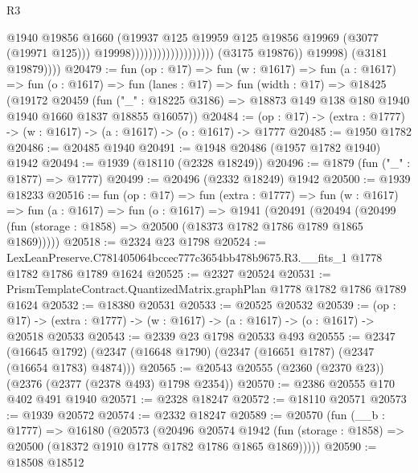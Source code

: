 \begin{lexlean}{R3}
\begin{coremodule}
                                                    @1940
                                                    @19856
                                                    @1660
                                                    (@19937
                                                      @125
                                                      @19959
                                                      @125
                                                      @19856
                                                      @19969
                                                      (@3077 (@19971 @125)))
                                                    @19998)))))))))))))))))))
              (@3175 @19876))
            @19998)
          (@3181 @19879))))
@20479 := fun (op : @17) =>
  fun (w : @1617) =>
  fun (a : @1617) =>
  fun (o : @1617) =>
  fun (lanes : @17) =>
  fun (width : @17) =>
  @18425
    (@19172
      @20459
      (fun ("_" : @18225 @3186) => @18873 @149 @138 @180 @1940 @1940 @1660 @1837 @18855 @16057))
@20484 := (op : @17) -> (extra : @1777) -> (w : @1617) -> (a : @1617) -> (o : @1617) -> @1777
@20485 := @1950 @1782
@20486 := @20485 @1940
@20491 := @1948 @20486 (@1957 @1782 @1940) @1942
@20494 := @1939 (@18110 (@2328 @18249))
@20496 := @1879 (fun ("_" : @1877) => @1777)
@20499 := @20496 (@2332 @18249) @1942
@20500 := @1939 @18233
@20516 := fun (op : @17) =>
  fun (extra : @1777) =>
  fun (w : @1617) =>
  fun (a : @1617) =>
  fun (o : @1617) =>
  @1941
    (@20491
      (@20494 (@20499 (fun (storage : @1858) => @20500 (@18373 @1782 @1786 @1789 @1865 @1869)))))
@20518 := @2324 @23 @1798
@20524 := LexLeanPreserve.C781405064bccec777c3654bb478b9675.R3.__fits_1
    @1778
    @1782
    @1786
    @1789
    @1624
@20525 := @2327 @20524
@20531 := PrismTemplateContract.QuantizedMatrix.graphPlan @1778 @1782 @1786 @1789 @1624
@20532 := @18380 @20531
@20533 := @20525 @20532
@20539 := (op : @17) ->
  (extra : @1777) -> (w : @1617) -> (a : @1617) -> (o : @1617) -> @20518 @20533
@20543 := @2339 @23 @1798 @20533 @493
@20555 := @2347
    (@16645 @1792)
    (@2347 (@16648 @1790) (@2347 (@16651 @1787) (@2347 (@16654 @1783) @4874)))
@20565 := @20543 @20555 (@2360 (@2370 @23)) (@2376 (@2377 (@2378 @493) @1798 @2354))
@20570 := @2386 @20555 @170 @402 @491 @1940
@20571 := @2328 @18247
@20572 := @18110 @20571
@20573 := @1939 @20572
@20574 := @2332 @18247
@20589 := @20570
    (fun (__b : @1777) =>
    @16180
      (@20573
        (@20496
          @20574
          @1942
          (fun (storage : @1858) => @20500 (@18372 @1910 @1778 @1782 @1786 @1865 @1869)))))
@20590 := @18508 @18512

\end{coremodule}
\end{lexlean}
